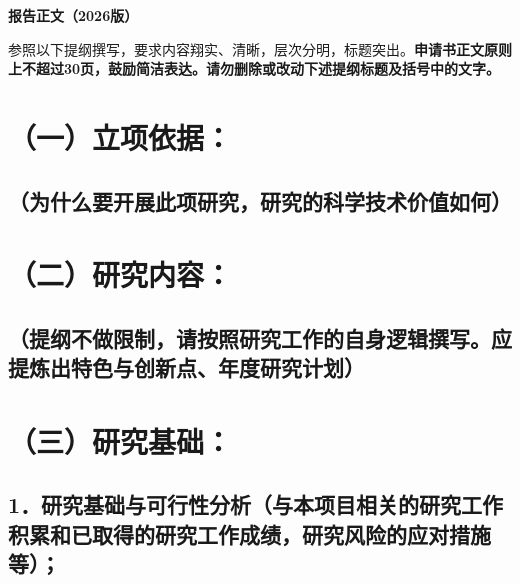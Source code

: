 \documentclass[12pt,UTF8,AutoFakeBold=2.5,a4paper,fontset=none]{ctexart} %
\begin{document}
{\centering
\vspace{-0.5em}
{\sanhao \templatefont \bfseries 报告正文（2026版）}\par
\vspace{0.3em}
}

{\sihao \templatefont \hspace*{2em}参照以下提纲撰写，要求内容翔实、清晰，层次分明，标题突出。{\bfseries \color{red}申请书正文原则上不超过30页，鼓励简洁表达。}{\bfseries \color{MsBlue}请勿删除或改动下述\linebreak{}提纲标题及括号中的文字。}}

\par\vspace{1.8em}

\section{（一）立项依据：}
\subsection{（为什么要开展此项研究，研究的科学技术价值如何）}





\section{（二）研究内容：}
\subsection{\texorpdfstring{（提纲不做限制，请按照研究工作的自身逻辑撰写。应提炼出特\linebreak{}色与创新点、年度研究计划）}{（提纲不做限制，请按照研究工作的自身逻辑撰写。应提炼出特色与创新点、年度研究计划）}}





\section{（三）研究基础：}

\subsection{\texorpdfstring{1．\textbf{研究基础与可行性分析}（与本项目相关的研究工作积累和已取\linebreak{}得的研究工作成绩，研究风险的应对措施等）；}{1．研究基础与可行性分析（与本项目相关的研究工作积累和已取得的研究工作成绩，研究风险的应对措施等）；}}
\end{document}
